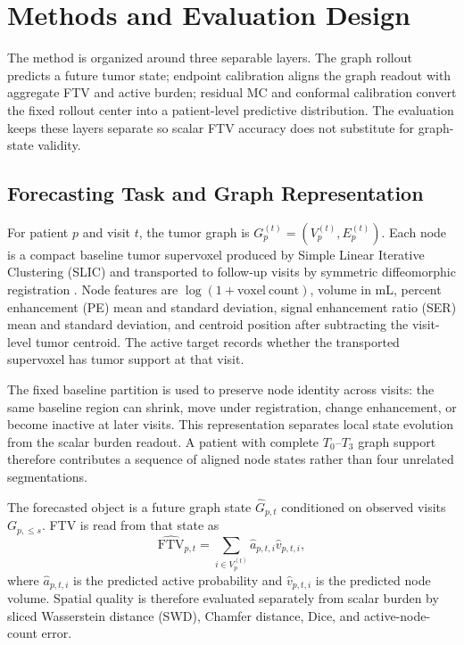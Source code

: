 \documentclass[journal,twoside,print]{ieeecolor}
\newcommand{\Tzero}{\ensuremath{T_0}}
\newcommand{\Tthree}{\ensuremath{T_3}}
\newcommand{\ftv}{\mathrm{FTV}}
\begin{document}
\section{Methods and Evaluation Design}
\label{sec:methods}

The method is organized around three separable layers. The graph rollout
predicts a future tumor state; endpoint calibration aligns the graph readout
with aggregate FTV and active burden; residual MC and conformal calibration
convert the fixed rollout center into a patient-level predictive distribution.
The evaluation keeps these layers separate so scalar FTV accuracy does not
substitute for graph-state validity.

\subsection{Forecasting Task and Graph Representation}

For patient $p$ and visit $t$, the tumor graph is
$G_p^{(t)}=(V_p^{(t)},E_p^{(t)})$. Each node is a compact baseline tumor
supervoxel produced by Simple Linear Iterative Clustering (SLIC)
\cite{achanta2012slic} and transported to follow-up visits by symmetric
diffeomorphic registration \cite{avants2008symmetric}. Node features are
$\log(1+\mathrm{voxel\ count})$, volume in mL, percent enhancement (PE) mean
and standard deviation, signal enhancement ratio (SER) mean and standard
deviation, and centroid position after subtracting the visit-level tumor
centroid. The active target records whether the transported supervoxel has
tumor support at that visit.

The fixed baseline partition is used to preserve node identity across visits:
the same baseline region can shrink, move under registration, change
enhancement, or become inactive at later visits. This representation separates
local state evolution from the scalar burden readout. A patient with complete
\Tzero--\Tthree{} graph support therefore contributes a sequence of aligned
node states rather than four unrelated segmentations.

The forecasted object is a future graph state
$\widehat{G}_{p,t}$ conditioned on observed visits $G_{p,\leq s}$. FTV is read
from that state as
\begin{equation}
\widehat{\ftv}_{p,t} =
\sum_{i\in V_p^{(t)}} \widehat{a}_{p,t,i}\widehat{v}_{p,t,i},
\end{equation}
where $\widehat{a}_{p,t,i}$ is the predicted active probability and
$\widehat{v}_{p,t,i}$ is the predicted node volume. Spatial quality is
therefore evaluated separately from scalar burden by sliced Wasserstein
distance (SWD), Chamfer distance, Dice, and active-node-count error.
\end{document}
